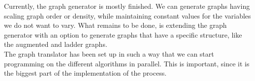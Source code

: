 Currently, the graph generator is mostly finished. We can generate graphs having scaling graph order or density, while maintaining constant values for the variables we do not want to vary. What remains to be done, is extending the graph generator with an option to generate graphs that have a specific structure, like the augmented and ladder graphs. \\

The graph translator has been set up in such a way that we can start programming on the different algorithms in parallel. This is important, since it is the biggest part of the implementation of the process.